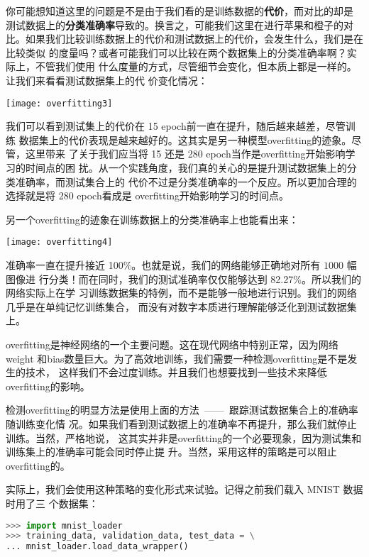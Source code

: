 你可能想知道这里的问题是不是由于我们看的是训练数据的\textbf{代价}，而对比的却是
测试数据上的\textbf{分类准确率}导致的。换言之，可能我们这里在进行苹果和橙子的对
比。如果我们比较训练数据上的代价和测试数据上的代价，会发生什么，我们是在比较类似
的度量吗？或者可能我们可以比较在两个数据集上的分类准确率啊？实际上，不管我们使用
什么度量的方式，尽管细节会变化，但本质上都是一样的。让我们来看看测试数据集上的代
价变化情况：
\begin{center}
  \texttt{[image: overfitting3]}
\end{center}

我们可以看到测试集上的代价在 15 \gls*{epoch}前一直在提升，随后越来越差，尽管训练
数据集上的代价表现是越来越好的。这其实是另一种模型\gls*{overfitting}的迹象。尽管，这里带来
了关于我们应当将 15 还是 280 \gls*{epoch}当作是\gls*{overfitting}开始影响学习的时间点的困
扰。从一个实践角度，我们真的关心的是提升测试数据集上的分类准确率，而测试集合上的
代价不过是分类准确率的一个反应。所以更加合理的选择就是将 280 \gls*{epoch}看成是
\gls*{overfitting}开始影响学习的时间点。

另一个\gls*{overfitting}的迹象在训练数据上的分类准确率上也能看出来：
\begin{center}
  \texttt{[image: overfitting4]}
\end{center}

准确率一直在提升接近 100\%。也就是说，我们的网络能够正确地对所有 $1000$ 幅图像进
行分类！而在同时，我们的测试准确率仅仅能够达到 82.27\%。所以我们的网络实际上在学
习训练数据集的特例，而不是能够一般地进行识别。我们的网络几乎是在单纯记忆训练集合，
而没有对数字本质进行理解能够泛化到测试数据集上。

\gls*{overfitting}是神经网络的一个主要问题。这在现代网络中特别正常，因为网络\gls*{weight}
和\gls*{bias}数量巨大。为了高效地训练，我们需要一种检测\gls*{overfitting}是不是发生的技术，
这样我们不会过度训练。并且我们也想要找到一些技术来降低\gls*{overfitting}的影响。

检测\gls*{overfitting}的明显方法是使用上面的方法~——~跟踪测试数据集合上的准确率随训练变化情
况。如果我们看到测试数据上的准确率不再提升，那么我们就停止训练。当然，严格地说，
这其实并非是\gls*{overfitting}的一个必要现象，因为测试集和训练集上的准确率可能会同时停止提
升。当然，采用这样的策略是可以阻止\gls*{overfitting}的。

实际上，我们会使用这种策略的变化形式来试验。记得之前我们载入 MNIST 数据时用了三
个数据集：

\begin{lstlisting}[language=Python]
>>> import mnist_loader
>>> training_data, validation_data, test_data = \
... mnist_loader.load_data_wrapper()
\end{lstlisting}


